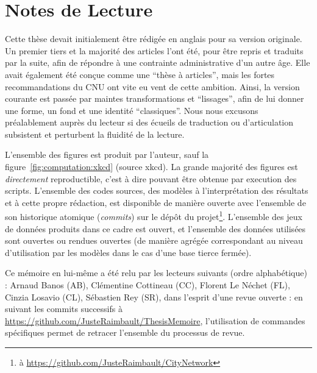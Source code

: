 



\begingroup
\let\clearpage\relax
\let\cleardoublepage\relax
\let\cleardoublepage\relax


\chapter*{Notes de Lecture}



Cette thèse devait initialement être rédigée en anglais pour sa version originale. Un premier tiers et la majorité des articles l'ont été, pour être repris et traduits par la suite, afin de répondre à une contrainte administrative d'un autre âge. Elle avait également été conçue comme une ``thèse à articles'', mais les fortes recommandations du CNU ont vite eu vent de cette ambition. Ainsi, la version courante est passée par maintes transformations et ``lissages'', afin de lui donner une forme, un fond et une identité ``classiques''. Nous nous excusons préalablement auprès du lecteur si des écueils de traduction ou d'articulation subsistent et perturbent la fluidité de la lecture.

L'ensemble des figures est produit par l'auteur, sauf la figure~\ref{fig:computation:xkcd} (source xkcd). La grande majorité des figures est \emph{directement} reproductible, c'est à dire pouvant être obtenue par execution des scripts. L'ensemble des codes sources, des modèles à l'interprétation des résultats et à cette propre rédaction, est disponible de manière ouverte avec l'ensemble de son historique atomique (\emph{commits}) sur le dépôt du projet\footnote{à \url{https://github.com/JusteRaimbault/CityNetwork}}. L'ensemble des jeux de données produits dans ce cadre est ouvert, et l'ensemble des données utilisées sont ouvertes ou rendues ouvertes (de manière agrégée correspondant au niveau d'utilisation par les modèles dans le cas d'une base tierce fermée).

Ce mémoire en lui-même a été relu par les lecteurs suivants (ordre alphabétique) : Arnaud Banos (AB), Clémentine Cottineau (CC), Florent Le Néchet (FL), Cinzia Losavio (CL), Sébastien Rey (SR), dans l'esprit d'une revue ouverte : en suivant les commits successifs à \url{https://github.com/JusteRaimbault/ThesisMemoire}, l'utilisation de commandes spécifiques permet de retracer l'ensemble du processus de revue.

